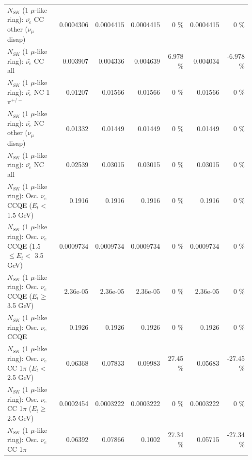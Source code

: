 \begin{table}
\begin{tabular}{| l | r | r | r  r | r  r |}
          $N_{SK}$ (1 $\mu$-like ring): $\bar{\nu_e}$ CC other ($\nu_\mu$ disap) &       0.0004306 &       0.0004415 &       0.0004415 &        0 \%  &       0.0004415 &        0 \%  \\ 
                            $N_{SK}$ (1 $\mu$-like ring): $\bar{\nu_{e}}$ CC all &        0.003907 &        0.004336 &        0.004639 &    6.978 \%  &        0.004034 &   -6.978 \%  \\ 
\hline
                     $N_{SK}$ (1 $\mu$-like ring): $\bar{\nu_e}$ NC 1$\pi^{+/-}$ &         0.01207 &         0.01566 &         0.01566 &        0 \%  &         0.01566 &        0 \%  \\ 
          $N_{SK}$ (1 $\mu$-like ring): $\bar{\nu_e}$ NC other ($\nu_\mu$ disap) &         0.01332 &         0.01449 &         0.01449 &        0 \%  &         0.01449 &        0 \%  \\ 
                            $N_{SK}$ (1 $\mu$-like ring): $\bar{\nu_{e}}$ NC all &         0.02539 &         0.03015 &         0.03015 &        0 \%  &         0.03015 &        0 \%  \\ 
\hline
\hline
\hline
             $N_{SK}$ (1 $\mu$-like ring): Osc. $\nu_e$ CCQE ($E_{t} <$ 1.5 GeV) &          0.1916 &          0.1916 &          0.1916 &        0 \%  &          0.1916 &        0 \%  \\ 
    $N_{SK}$ (1 $\mu$-like ring): Osc. $\nu_e$ CCQE (1.5 $\leq E_{t} <$ 3.5 GeV) &       0.0009734 &       0.0009734 &       0.0009734 &        0 \%  &       0.0009734 &        0 \%  \\ 
          $N_{SK}$ (1 $\mu$-like ring): Osc. $\nu_e$ CCQE ($E_{t} \geq$ 3.5 GeV) &        2.36e-05 &        2.36e-05 &        2.36e-05 &        0 \%  &        2.36e-05 &        0 \%  \\ 
\hline
                                 $N_{SK}$ (1 $\mu$-like ring): Osc. $\nu_e$ CCQE &          0.1926 &          0.1926 &          0.1926 &        0 \%  &          0.1926 &        0 \%  \\ 
\hline
        $N_{SK}$ (1 $\mu$-like ring): Osc. $\nu_e$ CC 1$\pi$ ($E_{t} <$ 2.5 GeV) &         0.06368 &         0.07833 &         0.09983 &    27.45 \%  &         0.05683 &   -27.45 \%  \\ 
     $N_{SK}$ (1 $\mu$-like ring): Osc. $\nu_e$ CC 1$\pi$ ($E_{t} \geq$ 2.5 GeV) &       0.0002454 &       0.0003222 &       0.0003222 &        0 \%  &       0.0003222 &        0 \%  \\ 
\hline
                            $N_{SK}$ (1 $\mu$-like ring): Osc. $\nu_e$ CC 1$\pi$ &         0.06392 &         0.07866 &          0.1002 &    27.34 \%  &         0.05715 &   -27.34 \%  \\ 

\end{tabular}
\end{table}
